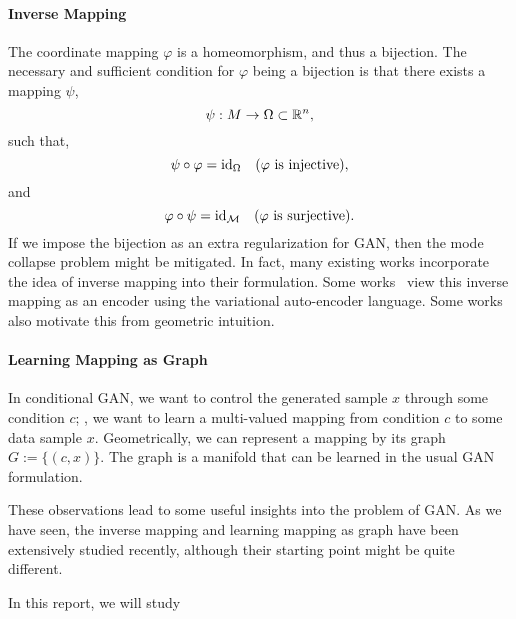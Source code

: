 \paragraph{Inverse Mapping}
The coordinate mapping $\varphi$ is a homeomorphism,
and thus a bijection.
The necessary and sufficient condition for $\varphi$ being a bijection is
that there exists a mapping $\psi$,
\begin{equation}
    \psi:M\to \Omega\subset{\mathbb{R}}^n,
\end{equation}
such that,
\begin{equation}
    \psi\circ\varphi = {\mathop{\mathrm{id}}}_\Omega \quad
    (\varphi\text{ is injective}),
\end{equation}
and
\begin{equation}
    \varphi\circ\psi = {\mathop{\mathrm{id}}}_{\mathcal{M}} \quad
    (\varphi\text{ is surjective}).
\end{equation}
If we impose the bijection as an extra regularization for GAN,
then the mode collapse problem might be mitigated.
In fact,
many existing works incorporate the idea of
inverse mapping into their formulation.
Some works~\cite{huang2016stacked,che2016mode,kim2017learning,perarnau2016invertible}
view this inverse mapping as an encoder using the
variational auto-encoder language.
Some works~\cite{zhu2016generative,zhu2017unpaired} also
motivate this from geometric intuition.

\paragraph{Learning Mapping as Graph}
In conditional GAN,
we want to control the generated sample $x$ through some condition $c$;
\ie,
we want to learn a multi-valued mapping from condition $c$ to
some data sample $x$.
Geometrically,
we can represent a mapping by its graph $G:=\{(c,x)\}$.
The graph is a manifold that can be learned in the usual GAN formulation.

These observations lead to some useful insights into the problem of GAN.
As we have seen,
the inverse mapping and learning mapping as graph have been
extensively studied recently,
although their starting point might be quite different.

In this report,
we will study
